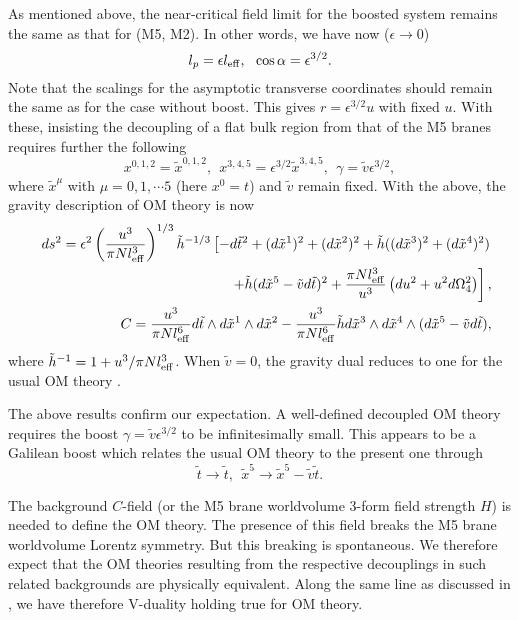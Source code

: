 \documentclass[a4paper,12pt]{article}
\begin{document}
	As mentioned above, the near-critical field limit for the
boosted system remains the same as that for (M5, M2). In other words,
we have now ($\epsilon \to 0$)
\begin{equation}
l_p = \epsilon l_{\rm eff}, \ \ \cos\alpha = \epsilon^{3/2}.
\label{eq:ncl}
\end{equation}
Note that the scalings for the asymptotic transverse coordinates should
remain the same as for the case without boost. This gives $r =
\epsilon^{3/2} u$ with fixed $u$. With these, insisting the decoupling of a
flat bulk region from that of the M5 branes requires further the following 
\begin{equation}
x^{0, 1, 2} = \tilde x^{0, 1, 2}, \ \ x^{3, 4, 5} = \epsilon^{3/2} 
\tilde x^{3, 4, 5}, \  \ \gamma = \tilde v \epsilon^{3/2},
\label{eq:omsl}
\end{equation}
where $\tilde x^\mu$ with $\mu = 0, 1, \cdots 5$ (here $x^0 = t$)
and $\tilde v$ remain fixed. With the above, the gravity description of
OM theory is now  
\begin{eqnarray}
\label{3eq15}
&& ds^2 = \epsilon^2 \left (\frac{u^3}{\pi N l^3_{\rm eff}}\right)^{1/3}
   \tilde{h}^{-1/3} \left [ -d\tilde{t}^2 +(d\tilde{x}^1)^2
   +(d\tilde{x}^2)^2
   + \tilde{h} ((d\tilde{x}^3)^2 + (d\tilde{x}^4)^2)
   \right. \nonumber \\
&& ~~~~~~~~ \left.+ \tilde{h} (d\tilde{x}^5 -\tilde{v} d\tilde{t})^2
   +\frac{\pi N l^3_{\rm eff}}{u^3}\left ( du^2 +u^2 d\Omega_4^2\right)
   \right ], \nonumber \\
&&  C = \frac{ u^3}{\pi N l^6_{\rm eff}}d\tilde{t} \wedge d
    \tilde{x}^1 \wedge d\tilde{x}^2
  -\frac{u^3}{\pi N l^6_{\rm eff}}\tilde{h}d\tilde{x}^3 \wedge
    d\tilde{x}^4 \wedge (d\tilde{x}^5 -\tilde{v} d\tilde{t}),
\end{eqnarray}
where $\tilde{h}^{-1} = 1 +u^3/\pi N l^3_{\rm eff}$.
When $\tilde{v}=0$, the gravity dual reduces to one for the usual
OM theory \cite{Harm}.

	The above results confirm our expectation. A well-defined
decoupled OM theory requires the boost $\gamma = \tilde v \epsilon^{3/2}$
to be infinitesimally small. This appears to be a Galilean boost which 
relates the usual OM theory to the present one through
\begin{equation}
\tilde t \to \tilde t, \ \ \tilde x^5 \to \tilde x^5 - \tilde v 
\tilde t.
\label{eq:gb}
\end{equation}

The background $C$-field (or the M5 brane worldvolume 3-form field
strength $H$) is needed to define the OM theory. The presence of this
field breaks the M5 brane worldvolume Lorentz symmetry. But this
breaking is spontaneous. We therefore expect that the OM theories resulting 
from the respective decouplings in such related backgrounds 
are physically equivalent. Along the same line as discussed in
\cite{CLW}, we have therefore V-duality holding true for OM theory.
\end{document}
